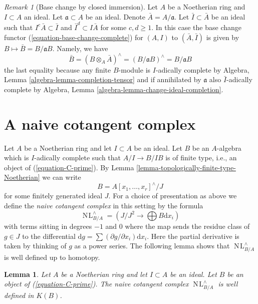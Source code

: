 \documentclass{stacks-project}
\theoremstyle{plain}
\newtheorem{lemma}[subsection]{Lemma}
\theoremstyle{definition}
\theoremstyle{remark}
\newtheorem{remark}[subsection]{Remark}
\numberwithin{equation}{subsection}
\def\NL{\mathop{N\!L}\nolimits}
\begin{document}
\begin{remark}[Base change by closed immersion]
\label{remark-take-bar}
Let $A$ be a Noetherian ring and $I \subset A$ an ideal.
Let $\mathfrak a \subset A$ be an ideal. Denote $\bar A = A/\mathfrak a$.
Let $\bar I \subset \bar A$ be an ideal such that
$I^c \bar A \subset \bar I$ and $\bar I^d \subset I\bar A$
for some $c, d \geq 1$. In this case the base change functor
(\ref{equation-base-change-complete}) for $(A, I)$ to $(\bar A, \bar I)$
is given by $B \mapsto \bar B = B/\mathfrak aB$. Namely, we have
\begin{equation}
\label{equation-base-change-to-closed}
\bar B = (B \otimes_A \bar A)^\wedge = (B/\mathfrak a B)^\wedge =
B/\mathfrak a B
\end{equation}
the last equality because any finite $B$-module is $I$-adically complete by
Algebra, Lemma \ref{algebra-lemma-completion-tensor}
and if annihilated by $\mathfrak a$ also $\bar I$-adically complete by
Algebra, Lemma \ref{algebra-lemma-change-ideal-completion}.
\end{remark}







\section{A naive cotangent complex}
\label{section-naive-cotangent-complex}

\noindent
Let $A$ be a Noetherian ring and let $I \subset A$ be an ideal.
Let $B$ be an $A$-algebra which is $I$-adically complete such
that $A/I \to B/IB$ is of finite type, i.e., an object of
(\ref{equation-C-prime}).
By Lemma \ref{lemma-topologically-finite-type-Noetherian} we can write
$$
B = A[x_1, \ldots, x_r]^\wedge / J
$$
for some finitely generated ideal $J$. For a choice of presentation as
above we define the {\it naive cotangent complex}
in this setting by the formula
\begin{equation}
\label{equation-NL}
\NL_{B/A}^\wedge = (J/J^2 \longrightarrow \bigoplus B\text{d}x_i)
\end{equation}
with terms sitting in degrees $-1$ and $0$
where the map sends the residue class of $g \in J$ to the differential
$\text{d}g = \sum (\partial g/\partial x_i) \text{d}x_i$. Here
the partial derivative is taken by thinking of $g$ as a power series.
The following lemma shows that $\NL_{B/A}^\wedge$ is well defined
up to homotopy.

\begin{lemma}
\label{lemma-NL-up-to-homotopy}
Let $A$ be a Noetherian ring and let $I \subset A$ be an ideal.
Let $B$ be an object of (\ref{equation-C-prime}). The naive
cotangent complex $\NL_{B/A}^\wedge$ is well defined in $K(B)$.
\end{lemma}
\end{document}
